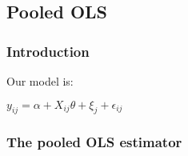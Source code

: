 
\subsection{Pooled OLS}

\subsubsection{Introduction}

Our model is:

\(y_{ij}=\alpha + X_{ij}\theta + \xi_j + \epsilon_{ij}\)

\subsubsection{The pooled OLS estimator}


